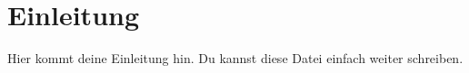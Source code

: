 \section{Einleitung}
Hier kommt deine Einleitung hin. Du kannst diese Datei einfach weiter schreiben.
